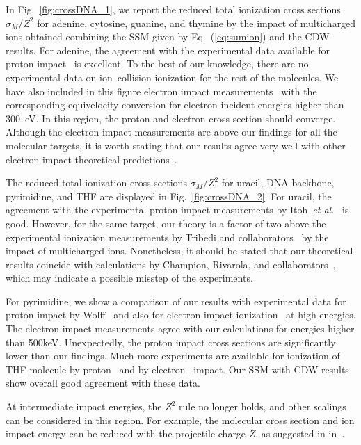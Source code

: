 \documentclass[10pt,showpacs,showkeys,twocolumn]{revtex4}
\begin{document}
In Fig.~\ref{fig:crossDNA_1}, we report the reduced total ionization cross 
sections $\sigma_M/Z^2$ for adenine, cytosine, guanine, and thymine 
by the impact of multicharged ions obtained combining the SSM given by 
Eq.~(\ref{eq:sumion}) and the CDW results. For adenine, the agreement 
with the experimental 
data available for proton impact~\cite{iriki2011} is excellent. To the 
best of our knowledge, there are no experimental data on ion--collision 
ionization for the rest of the molecules. We have also included in this 
figure electron impact measurements~\cite{rahman2016} with the 
corresponding equivelocity conversion for electron incident energies 
higher than 300~eV. In this region, the proton and electron cross 
section should converge. Although the electron impact measurements are 
above our findings for all the molecular targets, it is worth stating 
that our results agree very well with other electron impact theoretical 
predictions~\cite{mozejko2003,tan2018}. 

The reduced total ionization cross sections $\sigma_M/Z^2$ for uracil, 
DNA backbone, pyrimidine, and THF are displayed 
in Fig.~\ref{fig:crossDNA_2}. For uracil, the agreement with the 
experimental proton impact measurements by 
Itoh~{\it et al.}~\cite{itoh2013} is good.
However, for the same target, our theory is a factor of two above 
the experimental ionization measurements by Tribedi and 
collaborators~\cite{agnihotri2012,agnihotri2013} by the impact of 
multicharged ions.
Nonetheless, it should be stated that our theoretical results coincide 
with calculations by Champion, Rivarola, and 
collaborators~\cite{agnihotri2012,champion2012}, which may indicate a 
possible misstep of the experiments. 

For pyrimidine, we show a comparison of our results with experimental 
data for proton impact by Wolff~\cite{wolff2014} and also for electron
impact ionization~\cite{bug2017} at high energies. 
The electron impact measurements 
agree with our calculations for energies higher than 500keV. 
Unexpectedly, the proton impact cross sections are significantly lower 
than our findings. 
Much more experiments are available for ionization of THF molecule by 
proton~\cite{wang2016} and by electron~\cite{bug2017,wolf2019,fuss2009} 
impact. Our SSM with CDW results show overall good agreement with these
data.

At intermediate impact energies, the $Z^2$ rule no longer holds, and 
other scalings can be considered in this region. For example, the 
molecular cross section and ion impact energy can be reduced with the
projectile charge $Z$, as suggested in in~\cite{janev1980,dubois2013}. 
\end{document}
